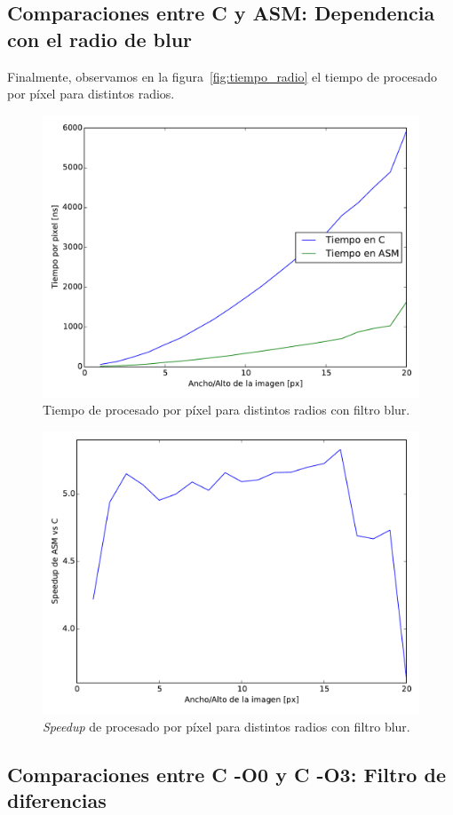 \subsection{Comparaciones entre C y ASM: Dependencia con el radio de
  blur}

Finalmente, observamos en la figura~\ref{fig:tiempo_radio} el tiempo
de procesado por píxel para distintos radios.

\begin{figure}
  \centering
  \includegraphics[width=0.7\columnwidth]{tiempo_radio_blur.pdf}
  \caption{Tiempo de procesado por píxel para distintos radios
    con filtro blur.}
  \label{fig:tiempo_radio_blur}
\end{figure}

\begin{figure}
  \centering
  \includegraphics[width=0.7\columnwidth]{speedup_radio_blur.pdf}
  \caption{\emph{Speedup} de procesado por píxel para distintos radios
    con filtro blur.}
  \label{fig:speedup_radio_blur}
\end{figure}

\subsection{Comparaciones entre C -O0 y C -O3: Filtro de diferencias}

